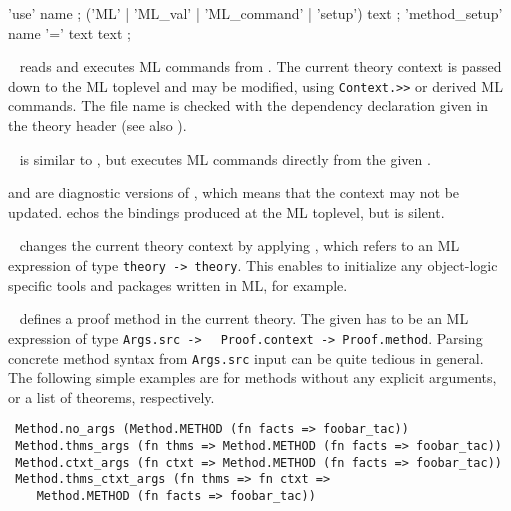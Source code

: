 \begin{isabellebody}
\begin{isamarkuptext}
  \begin{rail}
    'use' name
    ;
    ('ML' | 'ML\_val' | 'ML\_command' | 'setup') text
    ;
    'method\_setup' name '=' text text
    ;
  \end{rail}

  \begin{descr}

  \item [\mbox{\isa{\isacommand{use}}}~\isa{file}] reads and executes ML
  commands from .  The current theory context is passed
  down to the ML toplevel and may be modified, using \verb|Context.>>| or derived ML commands.  The file name is checked with
  the \mbox{} dependency declaration given in the theory
  header (see also ).
  
  \item [\mbox{\isa{\isacommand{ML}}}~\isa{text}] is similar to \mbox{}, but executes ML commands directly from the given .

  \item [\mbox{\isa{\isacommand{ML{\isacharunderscore}val}}} and \mbox{\isa{\isacommand{ML{\isacharunderscore}command}}}] are
  diagnostic versions of \mbox{}, which means that the context
  may not be updated.  \mbox{} echos the bindings produced
  at the ML toplevel, but \mbox{} is silent.
  
  \item [\mbox{\isa{\isacommand{setup}}}~\isa{text}] changes the current theory
  context by applying , which refers to an ML expression
  of type \verb|theory -> theory|.  This enables to initialize
  any object-logic specific tools and packages written in ML, for
  example.
  
  \item [\mbox{\isa{\isacommand{method{\isacharunderscore}setup}}}~\isa{name\ {\isacharequal}\ text\ description}]
  defines a proof method in the current theory.  The given  has to be an ML expression of type \verb|Args.src ->|\isasep\isanewline%
\verb|  Proof.context -> Proof.method|.  Parsing concrete method syntax
  from \verb|Args.src| input can be quite tedious in general.  The
  following simple examples are for methods without any explicit
  arguments, or a list of theorems, respectively.

{\footnotesize
\begin{verbatim}
 Method.no_args (Method.METHOD (fn facts => foobar_tac))
 Method.thms_args (fn thms => Method.METHOD (fn facts => foobar_tac))
 Method.ctxt_args (fn ctxt => Method.METHOD (fn facts => foobar_tac))
 Method.thms_ctxt_args (fn thms => fn ctxt =>
    Method.METHOD (fn facts => foobar_tac))
\end{verbatim}
}


\end{descr}
\end{isamarkuptext}
\end{isabellebody}
